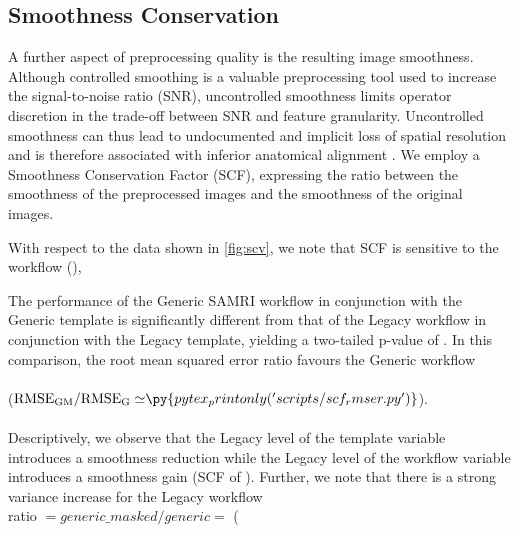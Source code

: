 \subsection{Smoothness Conservation}

A further aspect of preprocessing quality is the resulting image smoothness.
Although controlled smoothing is a valuable preprocessing tool used to increase the signal-to-noise ratio (SNR), uncontrolled smoothness limits operator discretion in the trade-off between SNR and feature granularity.
Uncontrolled smoothness can thus lead to undocumented and implicit loss of spatial resolution and is therefore associated with inferior anatomical alignment \cite{fmriprep}.
We employ a Smoothness Conservation Factor (SCF), expressing the ratio between the smoothness of the preprocessed images and the smoothness of the original images.

With respect to the data shown in \cref{fig:scv}, we note that SCF is sensitive to
the workflow (),

The performance of the Generic SAMRI workflow in conjunction with the Generic template is significantly different from that of the Legacy workflow in conjunction with the Legacy template, yielding a two-tailed p-value of .
In this comparison, the root mean squared error ratio favours the Generic workflow
\\
\\
($\mathrm{RMSE_{GM}/RMSE_{G}\simeq} \py{pytex_printonly('scripts/scf_rmser.py')}$).
\\
\\

Descriptively, we observe that the Legacy level of the template variable introduces a smoothness reduction
while the Legacy level of the workflow variable introduces a smoothness gain
(SCF of ).
Further, we note that there is a strong variance increase for the Legacy workflow
\\
ratio $= generic\_masked/generic =$ (
\\

